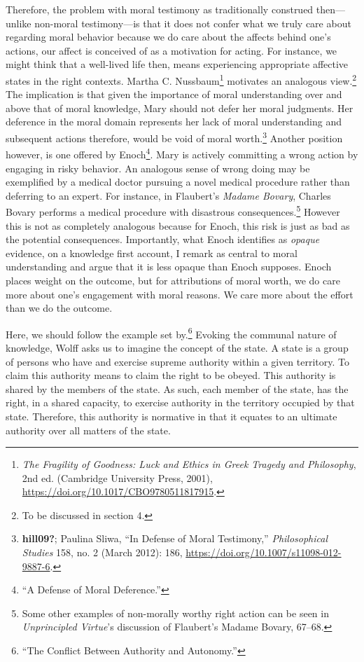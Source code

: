 \documentclass[phdthesis,12pt,final]{wuthesis}
\theoremstyle{definition}
\theoremstyle{definition}
\theoremstyle{definition}
\theoremstyle{definition}
\theoremstyle{remark}
\begin{document}
Therefore, the problem with moral testimony as traditionally construed then---unlike non-moral testimony---is that it does not confer what we truly care about regarding moral behavior because we do care about the affects behind one's actions, our affect is conceived of as a motivation for acting. For instance, we might think that a well-lived life then, means experiencing appropriate affective states in the right contexts. Martha C. Nussbaum\footnote{\emph{The {Fragility} of {Goodness}: {Luck} and {Ethics} in {Greek Tragedy} and {Philosophy}}, 2nd ed. (Cambridge University Press, 2001), \url{https://doi.org/10.1017/CBO9780511817915}.} motivates an analogous view.\footnote{To be discussed in section 4.} The implication is that given the importance of moral understanding over and above that of moral knowledge, Mary should not defer her moral judgments. Her deference in the moral domain represents her lack of moral understanding and subsequent actions therefore, would be void of moral worth.\footnote{\textbf{hill09?}; Paulina Sliwa, {``In Defense of Moral Testimony,''} \emph{Philosophical Studies} 158, no. 2 (March 2012): 186, \url{https://doi.org/10.1007/s11098-012-9887-6}.} Another position however, is one offered by Enoch\footnote{{``A {Defense} of {Moral Deference}.''}}. Mary is actively committing a wrong action by engaging in risky behavior. An analogous sense of wrong doing may be exemplified by a medical doctor pursuing a novel medical procedure rather than deferring to an expert. For instance, in Flaubert's \emph{Madame Bovary}, Charles Bovary performs a medical procedure with disastrous consequences.\footnote{ Some other examples of non-morally worthy right action can be seen in \emph{Unprincipled {Virtue}}'s discussion of Flaubert's Madame Bovary, 67--68.} However this is not as completely analogous because for Enoch, this risk is just as bad as the potential consequences. Importantly, what Enoch identifies as \emph{opaque} evidence, on a knowledge first account, I remark as central to moral understanding and argue that it is less opaque than Enoch supposes. Enoch places weight on the outcome, but for attributions of moral worth, we do care more about one's engagement with moral reasons. We care more about the effort than we do the outcome.

Here, we should follow the example set by.\footnote{{``The {Conflict Between Authority} and {Autonomy}.''}} Evoking the communal nature of knowledge, Wolff asks us to imagine the concept of the state. A state is a group of persons who have and exercise supreme authority within a given territory. To claim this authority means to claim the right to be obeyed. This authority is shared by the members of the state. As such, each member of the state, has the right, in a shared capacity, to exercise authority in the territory occupied by that state. Therefore, this authority is normative in that it equates to an ultimate authority over all matters of the state.
\end{document}
